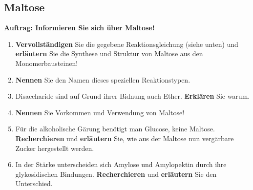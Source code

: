 \documentclass{scrartcl}  %
\begin{document}
		\subsection{Maltose}
		
			\textbf{Auftrag: Informieren Sie sich über Maltose!}
			\begin{enumerate}
    			\item \textbf{Vervollständigen} Sie die gegebene Reaktionsgleichung (siehe unten) und \textbf{erläutern} Sie die Synthese und Struktur von Maltose aus den Monomerbausteinen!
			    \item \textbf{Nennen} Sie den Namen dieses speziellen Reaktionstypen.
			    \item Disaccharide sind auf Grund ihrer Bidnung auch Ether. \textbf{Erklären} Sie warum.
			    \item \textbf{Nennen} Sie Vorkommen und Verwendung von Maltose!
			    \item Für die alkoholische Gärung benötigt man Glucose, keine Maltose. \textbf{Recherchieren} und \textbf{erläutern} Sie, wie aus der Maltose nun vergärbare Zucker hergestellt werden. 
			    \item In der Stärke unterscheiden sich Amylose und Amylopektin durch ihre glykosidischen Bindungen. \textbf{Recherchieren} und \textbf{erläutern} Sie den Unterschied.
			\end{enumerate}					
\end{document}
